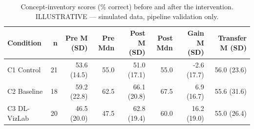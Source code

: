 \begin{table}[htbp]
\centering
\small
\caption{Concept-inventory scores (\% correct) before and after the intervention. ILLUSTRATIVE — simulated data, pipeline validation only.}
\label{tab:T02}
\begin{tabular}{lrrrrrrr}
\toprule
Condition & n & Pre M (SD) & Pre Mdn & Post M (SD) & Post Mdn & Gain M (SD) & Transfer M (SD) \\
\midrule
C1 Control & 21 & 53.6 (14.5) & 55.0 & 51.0 (17.1) & 55.0 & -2.6 (17.7) & 56.0 (23.6) \\
C2 Baseline & 18 & 59.2 (22.8) & 62.5 & 66.1 (20.8) & 67.5 & 6.9 (16.7) & 55.6 (31.6) \\
C3 DL-VizLab & 20 & 46.5 (20.0) & 47.5 & 62.8 (19.4) & 60.0 & 16.2 (19.0) & 55.0 (26.4) \\
\bottomrule
\end{tabular}
\end{table}
